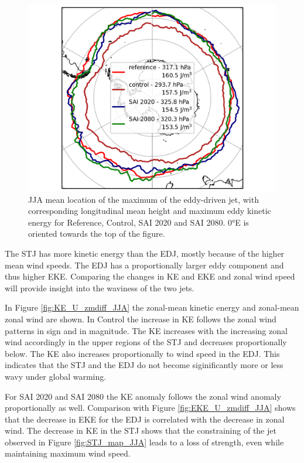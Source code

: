 \begin{figure}[H]
	\centering
	\includegraphics[width=0.48\linewidth]{images/EDJ_maxloc_JJA.png}
	\caption{JJA mean location of the maximum of the eddy-driven jet, with corresponding longitudinal mean height and maximum eddy kinetic energy for Reference, Control, SAI 2020 and SAI 2080. 0°E is oriented towards the top of the figure.}
	\label{fig:EDJ_maxloc_JJA}
\end{figure}
\newpage
The STJ has more kinetic energy than the EDJ, mostly because of the higher mean wind speeds. The EDJ has a proportionally larger eddy component and thus higher EKE. Comparing the changes in KE and EKE and zonal wind speed
will provide insight into the waviness of the two jets. 

In Figure \ref{fig:KE_U_zmdiff_JJA} the zonal-mean kinetic energy and zonal-mean zonal wind are shown. In Control the increase in KE follows the zonal wind patterns in sign and in magnitude. The KE increases with the increasing zonal wind accordingly in the upper regions of the STJ and decreases proportionally below. The KE also increases proportionally to wind speed in the EDJ. This indicates that the STJ and the EDJ do not become siginificantly more or less wavy under global warming.

For SAI 2020 and SAI 2080 the KE anomaly follows the zonal wind anomaly proportionally as well. Comparison with Figure \ref{fig:EKE_U_zmdiff_JJA} shows that the decrease in EKE for the EDJ is correlated with the decrease in zonal wind. The decrease in KE in the STJ shows that the constraining of the jet observed in Figure \ref{fig:STJ_map_JJA} leads to a loss of strength, even while maintaining maximum wind speed.


